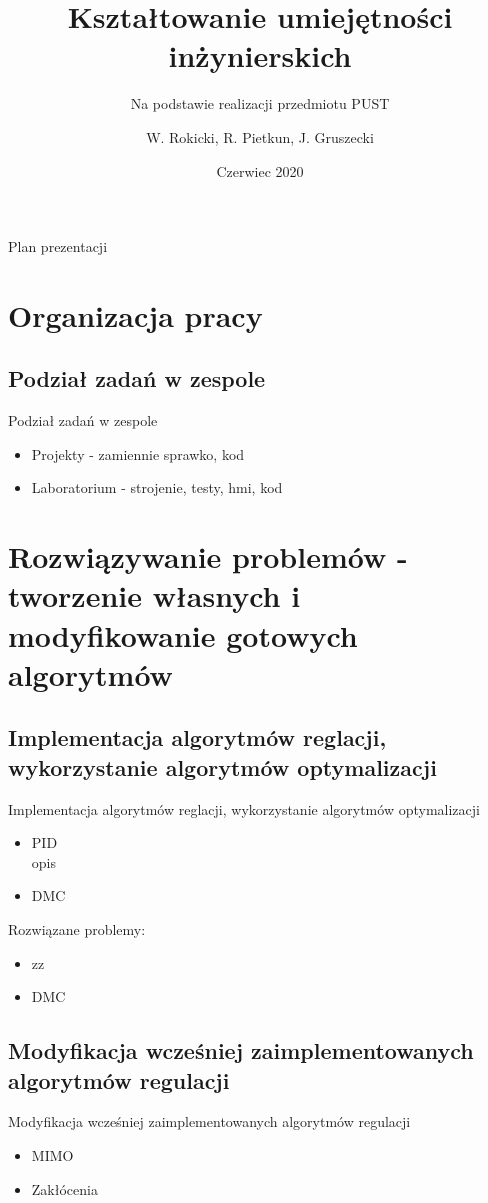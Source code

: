 \documentclass{beamer}
\title{Kształtowanie umiejętności inżynierskich}
\subtitle{Na podstawie realizacji przedmiotu PUST}
\author{W. Rokicki, R. Pietkun, J. Gruszecki}
\date{Czerwiec 2020}
\begin{document}
\begin{frame}
\titlepage
\end{frame}

\begin{frame}{Plan prezentacji}
\tableofcontents    
\end{frame}

\section{Organizacja pracy}

\subsection{Podział zadań w zespole}
\begin{frame}{Podział zadań w zespole}
	\begin{itemize}
		\item Projekty - zamiennie sprawko, kod
		\item Laboratorium - strojenie, testy, hmi, kod
	\end{itemize}
\end{frame}

\section{Rozwiązywanie problemów - tworzenie własnych i modyfikowanie gotowych algorytmów}

	\subsection{Implementacja algorytmów reglacji, wykorzystanie algorytmów optymalizacji}
	\begin{frame}{Implementacja algorytmów reglacji, wykorzystanie algorytmów optymalizacji}
		\begin{itemize}
			\item PID \\
			opis
			\item DMC
		\end{itemize}
		Rozwiązane problemy:
		\begin{itemize}
			\item zz
			\item DMC
		\end{itemize}
	\end{frame}
	
	\subsection{Modyfikacja wcześniej zaimplementowanych algorytmów regulacji}
	\begin{frame}{Modyfikacja wcześniej zaimplementowanych algorytmów regulacji}
		\begin{itemize}
			\item MIMO 
			\item Zakłócenia
		\end{itemize}
	\end{frame}
\end{document}
